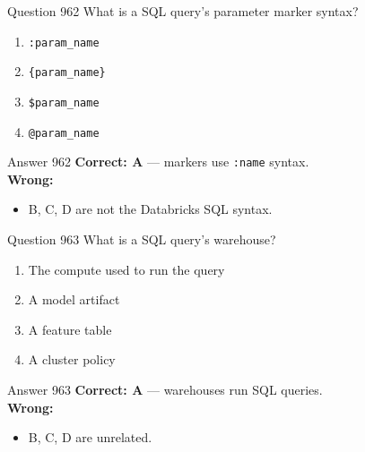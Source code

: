 \documentclass[aspectratio=169,11pt]{beamer}
\begin{document}
	\begin{frame}{Question 962}
		What is a SQL query's parameter marker syntax?
		\begin{enumerate}[label=\Alph*.]
			\item \texttt{:param\_name}
			\item \texttt{\{param\_name\}}
			\item \texttt{\$param\_name}
			\item \texttt{@param\_name}
		\end{enumerate}
	\end{frame}
	\begin{frame}{Answer 962}
		\textbf{Correct: A} --- markers use \texttt{:name} syntax.\\
		\vspace{0.5em}
		\textbf{Wrong:}
		\begin{itemize}
			\item B, C, D are not the Databricks SQL syntax.
		\end{itemize}
	\end{frame}
	
	\begin{frame}{Question 963}
		What is a SQL query's warehouse?
		\begin{enumerate}[label=\Alph*.]
			\item The compute used to run the query
			\item A model artifact
			\item A feature table
			\item A cluster policy
		\end{enumerate}
	\end{frame}
	\begin{frame}{Answer 963}
		\textbf{Correct: A} --- warehouses run SQL queries.\\
		\vspace{0.5em}
		\textbf{Wrong:}
		\begin{itemize}
			\item B, C, D are unrelated.
		\end{itemize}
	\end{frame}
	
\end{document}

